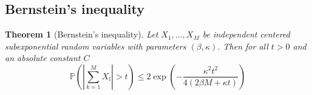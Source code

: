 \documentclass[10pt,a4paper]{article}
\theoremstyle{thmstyle}
\newtheorem{theorem}{Theorem}
\renewcommand{\Pr}[1]{\mathbb{P}\left( #1 \right)}
\begin{document}
\subsection{Bernstein's inequality}

\begin{theorem}[Bernstein's inequality]
  Let $X_{1}, \dots, X_{M}$ be independent centered subexponential random variables with parameters $(\beta, \kappa)$.
  Then for all $t > 0$ and an absolute constant $C$
  \begin{equation*}
    \Pr{\left| \sum_{k = 1}^{M} X_{l} \right| > t} \le 2\exp\left( -\frac{\kappa^{2} t^{2}}{4(2\beta M + \kappa t)} \right)
  \end{equation*}
\end{theorem}
\end{document}
